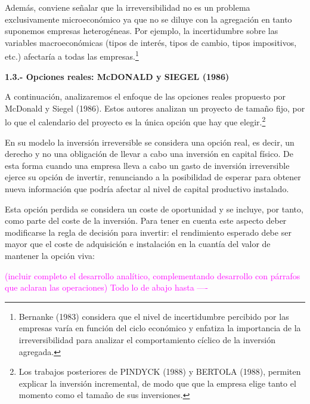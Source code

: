 \documentclass[10pt,a4paper]{article}
\begin{document}
Además, conviene señalar que la irreversibilidad no es un problema exclusivamente microeconómico ya que no se diluye con la agregación en tanto suponemos empresas heterogéneas. Por ejemplo, la incertidumbre sobre las variables macroeconómicas (tipos de interés, tipos de cambio, tipos impositivos, etc.) afectaría a todas las empresas.\footnote{%
    Bernanke (1983) considera que el nivel de incertidumbre percibido por las empresas varía en función del ciclo económico y enfatiza la importancia de la irreversibilidad para analizar el comportamiento cíclico de la inversión agregada.
}


\textbf{1.3.- Opciones reales: McDONALD y SIEGEL (1986)}

A continuación, analizaremos el enfoque de las opciones reales propuesto por McDonald y Siegel (1986). Estos autores analizan un proyecto de tamaño fijo, por lo que el calendario del proyecto es la única opción que hay que elegir.\footnote{%
  Los trabajos posteriores de PINDYCK (1988) y BERTOLA (1988), permiten explicar la inversión incremental, de modo que que la empresa elige tanto el momento como el tamaño de sus inversiones.
} 

En su modelo la inversión irreversible se considera una opción real, es decir, un derecho y no una obligación de llevar a cabo una inversión en capital físico. De esta forma cuando una empresa lleva a cabo un gasto de inversión irreversible ejerce su opción de invertir, renunciando a la posibilidad de esperar para obtener nueva información que podría afectar al nivel de capital productivo instalado. 

Esta opción perdida se considera un coste de oportunidad y se incluye, por tanto, como parte del coste de la inversión. Para tener en cuenta este aspecto deber modificarse la regla de decisión para invertir: el rendimiento esperado debe ser mayor que el coste de adquisición e instalación en la cuantía del valor de mantener la opción viva:

\textcolor{magenta}{(incluir completo el desarrollo analítico, complementando desarrollo con párrafos que aclaran las operaciones) Todo lo de abajo hasta ----}
\end{document}
